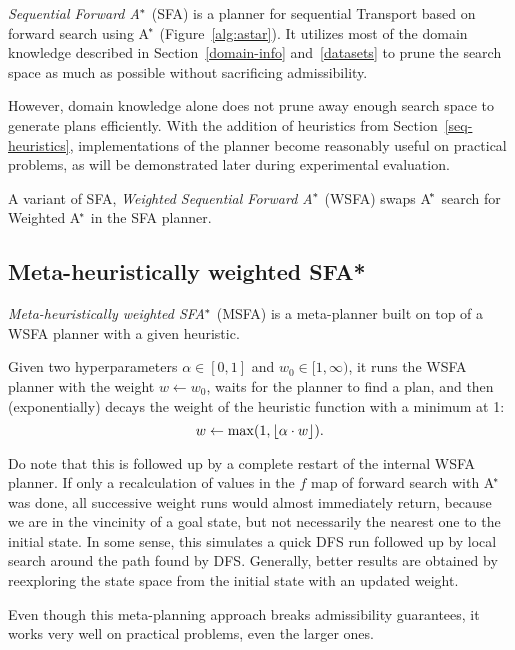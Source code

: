 \textit{Sequential Forward A$^{\kern-.05em*}$} (SFA) is a planner for sequential Transport based on forward search using A$^{\kern-.15em*}$ (Figure~\ref{alg:astar}).
It utilizes most of the domain knowledge described
in Section~\ref{domain-info} and~\ref{datasets}
to prune the search space as much as possible
without sacrificing admissibility.

However, domain knowledge alone does not
prune away enough search space to
generate plans efficiently.
With the addition of
heuristics
from Section~\ref{seq-heuristics},
implementations of the planner become reasonably useful
on practical problems, as will be demonstrated
later during experimental evaluation.

A variant of SFA,
\textit{Weighted Sequential Forward A$^{\kern-.05em*}$} (WSFA)
swaps A$^{\kern-.15em*}$ search for Weighted A$^{\kern-.15em*}$ in the SFA planner.

\subsection{Meta-heuristically weighted SFA*}\label{msfa}

\textit{Meta-heuristically weighted SFA$^{\kern-.05em*}$} (MSFA) is
a meta-planner built on top of a WSFA planner with
a given heuristic.

Given two hyperparameters $\alpha \in [0, 1]$ and $w_0 \in [1, \infty)$,
it runs the WSFA planner with the weight $w \gets w_0$,
waits for the planner to find a plan,
and then (exponentially) decays the
weight of the heuristic function
with a minimum at 1: $$w \gets \max(1, \floor*{\alpha \cdot w}).$$

Do note that this is followed up by a complete restart of the internal WSFA planner.
If only a recalculation of values in the $f$ map
of forward search with A$^{\kern-.15em*}$ was done, all successive
weight runs would almost immediately return, because we are in the vincinity of a goal state,
but not necessarily the nearest one to the initial state.
In some sense, this simulates a quick DFS run followed up
by local search around the path found by DFS.
Generally, better results are obtained by reexploring the
state space from the initial state with an updated weight.

Even though this meta-planning approach breaks
admissibility guarantees, it works very well on
practical problems, even the larger ones.



















